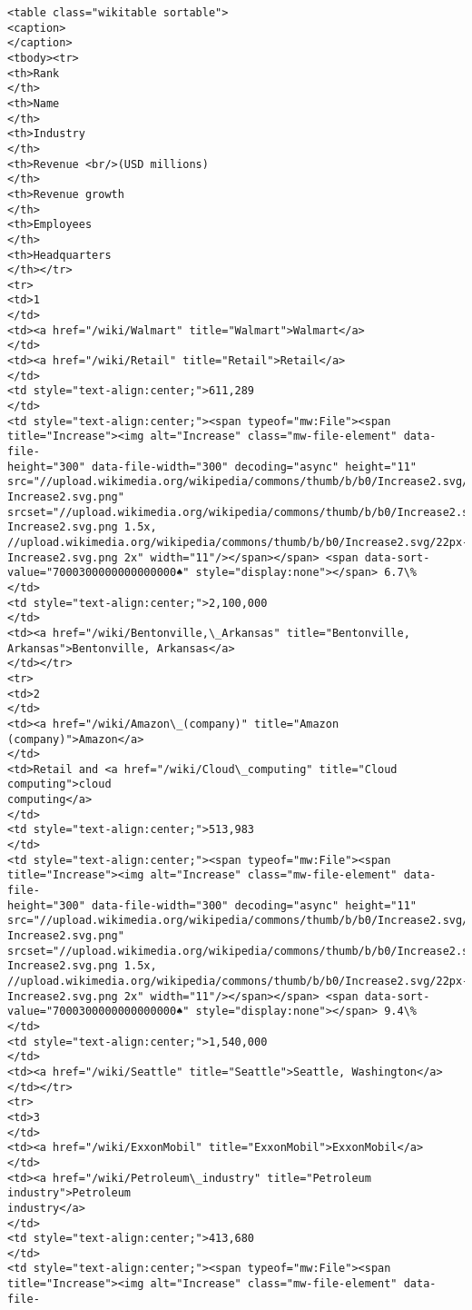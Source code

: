 \documentclass[11pt]{article}
\begin{document}
    \begin{Verbatim}[commandchars=\\\{\}]
<table class="wikitable sortable">
<caption>
</caption>
<tbody><tr>
<th>Rank
</th>
<th>Name
</th>
<th>Industry
</th>
<th>Revenue <br/>(USD millions)
</th>
<th>Revenue growth
</th>
<th>Employees
</th>
<th>Headquarters
</th></tr>
<tr>
<td>1
</td>
<td><a href="/wiki/Walmart" title="Walmart">Walmart</a>
</td>
<td><a href="/wiki/Retail" title="Retail">Retail</a>
</td>
<td style="text-align:center;">611,289
</td>
<td style="text-align:center;"><span typeof="mw:File"><span
title="Increase"><img alt="Increase" class="mw-file-element" data-file-
height="300" data-file-width="300" decoding="async" height="11"
src="//upload.wikimedia.org/wikipedia/commons/thumb/b/b0/Increase2.svg/11px-
Increase2.svg.png"
srcset="//upload.wikimedia.org/wikipedia/commons/thumb/b/b0/Increase2.svg/17px-
Increase2.svg.png 1.5x,
//upload.wikimedia.org/wikipedia/commons/thumb/b/b0/Increase2.svg/22px-
Increase2.svg.png 2x" width="11"/></span></span> <span data-sort-
value="7000300000000000000♠" style="display:none"></span> 6.7\%
</td>
<td style="text-align:center;">2,100,000
</td>
<td><a href="/wiki/Bentonville,\_Arkansas" title="Bentonville,
Arkansas">Bentonville, Arkansas</a>
</td></tr>
<tr>
<td>2
</td>
<td><a href="/wiki/Amazon\_(company)" title="Amazon (company)">Amazon</a>
</td>
<td>Retail and <a href="/wiki/Cloud\_computing" title="Cloud computing">cloud
computing</a>
</td>
<td style="text-align:center;">513,983
</td>
<td style="text-align:center;"><span typeof="mw:File"><span
title="Increase"><img alt="Increase" class="mw-file-element" data-file-
height="300" data-file-width="300" decoding="async" height="11"
src="//upload.wikimedia.org/wikipedia/commons/thumb/b/b0/Increase2.svg/11px-
Increase2.svg.png"
srcset="//upload.wikimedia.org/wikipedia/commons/thumb/b/b0/Increase2.svg/17px-
Increase2.svg.png 1.5x,
//upload.wikimedia.org/wikipedia/commons/thumb/b/b0/Increase2.svg/22px-
Increase2.svg.png 2x" width="11"/></span></span> <span data-sort-
value="7000300000000000000♠" style="display:none"></span> 9.4\%
</td>
<td style="text-align:center;">1,540,000
</td>
<td><a href="/wiki/Seattle" title="Seattle">Seattle, Washington</a>
</td></tr>
<tr>
<td>3
</td>
<td><a href="/wiki/ExxonMobil" title="ExxonMobil">ExxonMobil</a>
</td>
<td><a href="/wiki/Petroleum\_industry" title="Petroleum industry">Petroleum
industry</a>
</td>
<td style="text-align:center;">413,680
</td>
<td style="text-align:center;"><span typeof="mw:File"><span
title="Increase"><img alt="Increase" class="mw-file-element" data-file-

\end{Verbatim}
\end{document}
